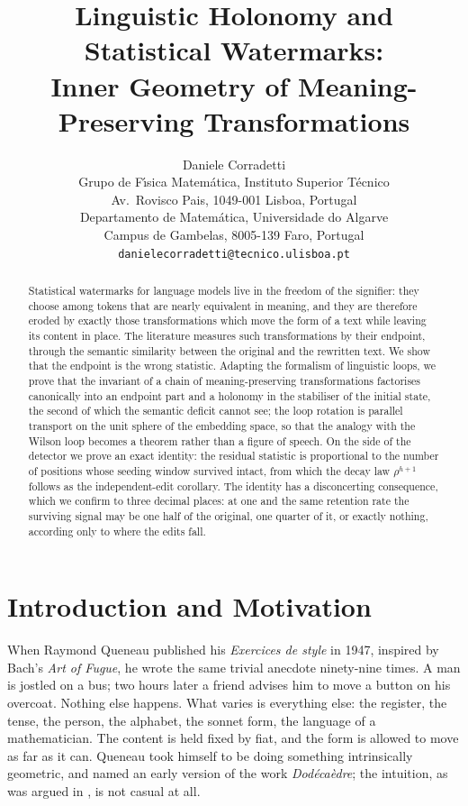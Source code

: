 \documentclass{article}
\title{Linguistic Holonomy and Statistical Watermarks:\\
Inner Geometry of Meaning-Preserving Transformations}
\author{%
  Daniele Corradetti \\
  Grupo de F\'\i sica Matem\'atica, Instituto Superior T\'ecnico \\
  Av.\ Rovisco Pais, 1049-001 Lisboa, Portugal \\
  Departamento de Matem\'atica, Universidade do Algarve \\
  Campus de Gambelas, 8005-139 Faro, Portugal \\
  \texttt{danielecorradetti@tecnico.ulisboa.pt} \\
}
\theoremstyle{plain}
\theoremstyle{definition}
\numberwithin{equation}{section}
\begin{document}
\maketitle

\begin{abstract}
Statistical watermarks for language models live in the freedom of the
signifier: they choose among tokens that are nearly equivalent in
meaning, and they are therefore eroded by exactly those transformations
which move the form of a text while leaving its content in place. The
literature measures such transformations by their endpoint, through the
semantic similarity between the original and the rewritten text. We show
that the endpoint is the wrong statistic. Adapting the formalism of
linguistic loops, we prove that the invariant of a chain of
meaning-preserving transformations factorises canonically into an
endpoint part and a holonomy in the stabiliser of the initial state, the
second of which the semantic deficit cannot see; the loop rotation is
parallel transport on the unit sphere of the embedding space, so that
the analogy with the Wilson loop becomes a theorem rather than a figure
of speech. On the side of the detector we prove an exact identity: the
residual statistic is proportional to the number of positions whose
seeding window survived intact, from which the decay law $\rho^{h+1}$
follows as the independent-edit corollary. The identity has a
disconcerting consequence, which we confirm to three decimal places: at
one and the same retention rate the surviving signal may be one half of
the original, one quarter of it, or exactly nothing, according only to
where the edits fall.
\end{abstract}

\section{Introduction and Motivation}

When Raymond Queneau published his \emph{Exercices de style} in 1947,
inspired by Bach's \emph{Art of Fugue}, he wrote the same trivial
anecdote ninety-nine times. A man is jostled on a bus; two hours later a
friend advises him to move a button on his overcoat. Nothing else
happens. What varies is everything else: the register, the tense, the
person, the alphabet, the sonnet form, the language of a
mathematician. The content is held fixed by fiat, and the form is
allowed to move as far as it can. Queneau took himself to be doing
something intrinsically geometric, and named an early version of the
work \emph{Dod\'eca\`edre}; the intuition, as was argued in \cite{CM25},
is not casual at all.
\end{document}

